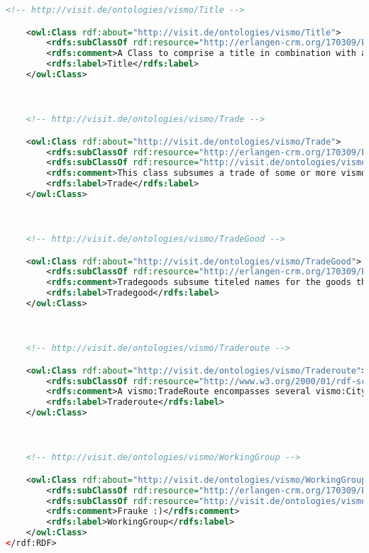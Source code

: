 \begin{lstlisting}[caption={VisMo Ontologie in der letzten (englischen) Version.},label={lst:vismo},captionpos=b,language=xml]
    <!-- http://visit.de/ontologies/vismo/Title -->

    <owl:Class rdf:about="http://visit.de/ontologies/vismo/Title">
        <rdfs:subClassOf rdf:resource="http://erlangen-crm.org/170309/E35_Title"/>
        <rdfs:comment>A Class to comprise a title in combination with a superordinate title of a reference collection that contains this vismo:Reference entity.</rdfs:comment>
        <rdfs:label>Title</rdfs:label>
    </owl:Class>
    


    <!-- http://visit.de/ontologies/vismo/Trade -->

    <owl:Class rdf:about="http://visit.de/ontologies/vismo/Trade">
        <rdfs:subClassOf rdf:resource="http://erlangen-crm.org/170309/E9_Move"/>
        <rdfs:subClassOf rdf:resource="http://visit.de/ontologies/vismo/Resource"/>
        <rdfs:comment>This class subsumes a trade of some or more vismo:TradeGood entities. A trade should always be associated with a vismo:TradeRoute.</rdfs:comment>
        <rdfs:label>Trade</rdfs:label>
    </owl:Class>
    


    <!-- http://visit.de/ontologies/vismo/TradeGood -->

    <owl:Class rdf:about="http://visit.de/ontologies/vismo/TradeGood">
        <rdfs:subClassOf rdf:resource="http://erlangen-crm.org/170309/E55_Type"/>
        <rdfs:comment>Tradegoods subsume titeled names for the goods that are transported and sold on vismo:TradeRoute objects.</rdfs:comment>
        <rdfs:label>Tradegood</rdfs:label>
    </owl:Class>
    


    <!-- http://visit.de/ontologies/vismo/Traderoute -->

    <owl:Class rdf:about="http://visit.de/ontologies/vismo/Traderoute">
        <rdfs:subClassOf rdf:resource="http://www.w3.org/2000/01/rdf-schema#Class"/>
        <rdfs:comment>A vismo:TradeRoute encompasses several vismo:City entities that are associated with the vismo:Trade that is associated with the given trade route. These cities can thereby be starting or end location, as well as an intermediate station.</rdfs:comment>
        <rdfs:label>Traderoute</rdfs:label>
    </owl:Class>
    


    <!-- http://visit.de/ontologies/vismo/WorkingGroup -->

    <owl:Class rdf:about="http://visit.de/ontologies/vismo/WorkingGroup">
        <rdfs:subClassOf rdf:resource="http://erlangen-crm.org/170309/E74_Group"/>
        <rdfs:subClassOf rdf:resource="http://visit.de/ontologies/vismo/Resource"/>
        <rdfs:comment>Frauke :)</rdfs:comment>
        <rdfs:label>WorkingGroup</rdfs:label>
    </owl:Class>
</rdf:RDF>

\end{lstlisting}